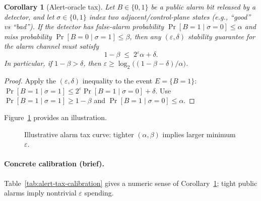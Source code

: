 \documentclass[11pt]{article}
\newtheorem{corollary}{Corollary}
\begin{document}
\begin{corollary}[Alert-oracle tax]
\label{cor:alert-oracle-tax}
Let $B\in\{0,1\}$ be a \emph{public} alarm bit released by a detector, and let $\sigma\in\{0,1\}$ index two adjacent/control-plane states (e.g., ``good'' vs ``bad'').
If the detector has false-alarm probability $\Pr[B{=}1\mid\sigma{=}0]\le \alpha$ and miss probability $\Pr[B{=}0\mid\sigma{=}1]\le \beta$, then any $(\varepsilon,\delta)$ stability guarantee for the \emph{alarm channel} must satisfy
\[
1-\beta \;\le\; 2^{\varepsilon}\alpha+\delta.
\]
In particular, if $1-\beta>\delta$, then $\varepsilon \ge \log_2\!\big((1-\beta-\delta)/\alpha\big)$.
\end{corollary}

\begin{proof}
Apply the $(\varepsilon,\delta)$ inequality to the event $E=\{B=1\}$:
$\Pr[B{=}1\mid\sigma{=}1]\le 2^{\varepsilon}\Pr[B{=}1\mid\sigma{=}0]+\delta$.
Use $\Pr[B{=}1\mid\sigma{=}1]\ge 1-\beta$ and $\Pr[B{=}1\mid\sigma{=}0]\le \alpha$.
\end{proof}

Figure~\ref{fig:alarm-tax} provides an illustration.

\begin{figure}[t]
  \centering
  \caption{Illustrative alarm tax curve: tighter $(\alpha,\beta)$ implies larger minimum $\varepsilon$.}
  \label{fig:alarm-tax}
\end{figure}

\paragraph{Concrete calibration (brief).}
Table~\ref{tab:alert-tax-calibration} gives a numeric sense of Corollary~\ref{cor:alert-oracle-tax}; tight public alarms imply nontrivial \(\varepsilon\) spending.
\end{document}
